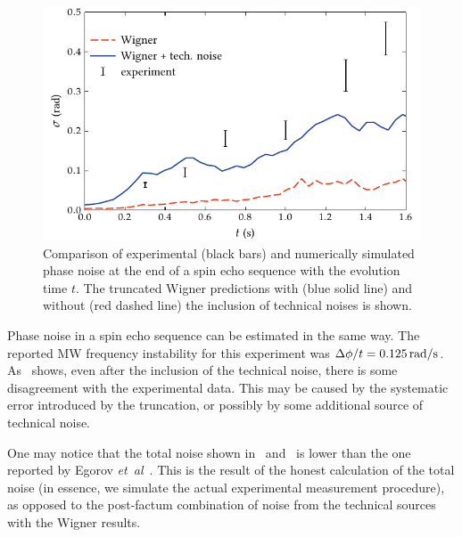 \begin{figure}
    \centerline{\includegraphics{figures_generated/bec_noise/echo_noise.pdf}}

    \caption[Experimental and numerically simulated phase noise in spin echo sequence]{
    Comparison of experimental (black bars) and numerically simulated phase noise at the end of a spin echo sequence with the evolution time $t$.
    The truncated Wigner predictions with (blue solid line) and without (red dashed line) the inclusion of technical noises is shown.}%

    \label{fig:bec-noise:phase-noise:echo-phnoise}
\end{figure}

Phase noise in a spin echo sequence can be estimated in the same way.
The reported MW frequency instability for this experiment was $\Delta \phi / t = 0.125\mbox{\ensuremath{\,\mathrm{rad/s}}}$.
As~ shows, even after the inclusion of the technical noise, there is some disagreement with the experimental data.
This may be caused by the systematic error introduced by the truncation, or possibly by some additional source of technical noise.

One may notice that the total noise shown in~ and~ is lower than the one reported by Egorov \textit{et~al}~\cite{Egorov2011,Egorov2012}.
This is the result of the honest calculation of the total noise (in essence, we simulate the actual experimental measurement procedure), as opposed to the post-factum combination of noise from the technical sources with the Wigner results.
